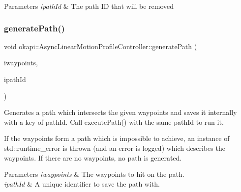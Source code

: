 \begin{DoxyParams}{Parameters}
{\em ipath\+Id} & The path ID that will be removed \\
\hline
\end{DoxyParams}
\mbox{\label{classokapi_1_1AsyncLinearMotionProfileController_aef2acba51417d929695ca38e309b0f6c}} 
\subsubsection{\texorpdfstring{generatePath()}{generatePath()}\hspace{0.1cm}{\footnotesize\ttfamily [1/2]}}
{\footnotesize\ttfamily void okapi\+::\+Async\+Linear\+Motion\+Profile\+Controller\+::generate\+Path (\begin{DoxyParamCaption}\item[{std\+::initializer\+\_\+list$<$ Q\+Length $>$}]{iwaypoints,  }\item[{const std\+::string \&}]{ipath\+Id }\end{DoxyParamCaption})}

Generates a path which intersects the given waypoints and saves it internally with a key of path\+Id. Call {\ttfamily execute\+Path()} with the same {\ttfamily path\+Id} to run it.

If the waypoints form a path which is impossible to achieve, an instance of {\ttfamily std\+::runtime\+\_\+error} is thrown (and an error is logged) which describes the waypoints. If there are no waypoints, no path is generated.


\begin{DoxyParams}{Parameters}
{\em iwaypoints} & The waypoints to hit on the path. \\
\hline
{\em ipath\+Id} & A unique identifier to save the path with. \\
\hline
\end{DoxyParams}
\mbox{\label{classokapi_1_1AsyncLinearMotionProfileController_ada94ccc2679082ea7fb2317458ca80d1}} 
